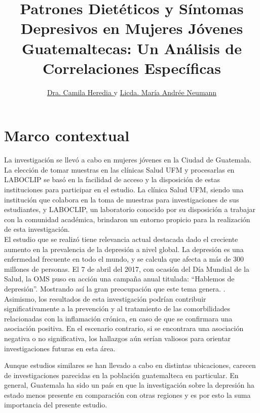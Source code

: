 \documentclass[man]{apa7}
\title{Patrones Dietéticos y Síntomas Depresivos en Mujeres Jóvenes Guatemaltecas: Un Análisis de Correlaciones Específicas}
\author{
	\href{https://orcid.org/0009-0008-9550-9083}{Dra. Camila Heredia \orcidlink{0009-0008-9550-9083}} 
    y 
    \href{https://orcid.org/0009-0001-2531-6058}{Licda. María Andrée Neumann \orcidlink{0009-0001-2531-6058}}
	}
\begin{document}
	\maketitle



	\section{Marco contextual}\label{marco-contextual}

	La investigación se llevó a cabo en mujeres jóvenes en la Ciudad de
	Guatemala. La elección de tomar muestras en las clínicas Salud UFM y
	procesarlas en LABOCLIP se basó en la facilidad de acceso y la
	disposición de estas instituciones para participar en el estudio. La
	clínica Salud UFM, siendo una institución que colabora en la toma de
	muestras para investigaciones de sus estudiantes, y LABOCLIP, un
	laboratorio conocido por su disposición a trabajar con la comunidad
	académica, brindaron un entorno propicio para la realización de esta
	investigación.\\

	El estudio que se realizó tiene relevancia actual destacada dado el
	creciente aumento en la prevalencia de la depresión a nivel global. La
	depresión es una enfermedad frecuente en todo el mundo, y se calcula que
	afecta a más de 300 millones de personas. El 7 de abril del 2017, con
	ocasión del Día Mundial de la Salud, la OMS puso en acción una campaña
	anual titulada: ``Hablemos de depresión''. Mostrando así la gran
	preocupación que este tema genera. \parencite{Toshi2022}.\\

	Asimismo, los resultados de esta investigación podrían contribuir
	significativamente a la prevención y al tratamiento de las
	comorbilidades relacionadas con la inflamación crónica, en caso de que
	se confirmara una asociación positiva. En el escenario contrario, si se
	encontrara una asociación negativa o no significativa, los hallazgos aún
	serían valiosos para orientar investigaciones futuras en esta área.

	Aunque estudios similares se han llevado a cabo en distintas
	ubicaciones, carecen de investigaciones parecidas en la población
	guatemalteca en particular. En general, Guatemala ha sido un país en que
	la investigación sobre la depresión ha estado menos presente en
	comparación con otras regiones y es por esto la suma importancia del
	presente estudio.\\
\end{document}
